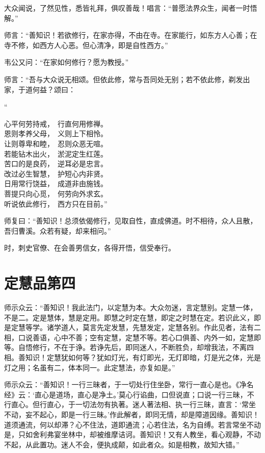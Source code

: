 \documentclass[UTF8, 11pt, oneside]{ctexart}
\newenvironment{jizi}[1]{
    \vspace{-1em}\begin{center}
        #1%
        \begin{varwidth}[t]{\linewidth}
}{
        \end{varwidth}
    \end{center}
}
\begin{document}
大众闻说，了然见性，悉皆礼拜，俱叹善哉！唱言：“普愿法界众生，闻者一时悟解。”

师言：“善知识！若欲修行，在家亦得，不由在寺。在家能行，如东方人心善；在寺不修，如西方人心恶。但心清净，即是自性西方。”

韦公又问：“在家如何修行？愿为教授。”

师言：“吾与大众说无相颂。但依此修，常与吾同处无别；若不依此修，剃发出家，于道何益？颂曰：

\begin{jizi}{“}
    心平何劳持戒，　行直何用修禅。 \\
    恩则孝养父母，　义则上下相怜。 \\
    让则尊卑和睦，　忍则众恶无喧。 \\
    若能钻木出火，　淤泥定生红莲。 \\
    苦口的是良药，　逆耳必是忠言。 \\
    改过必生智慧，　护短心内非贤。 \\
    日用常行饶益，　成道非由施钱。 \\
    菩提只向心觅，　何劳向外求玄。 \\
    听说依此修行，　西方只在目前。”
\end{jizi}

师复曰：“善知识！总须依偈修行，见取自性，直成佛道。时不相待，众人且散，吾归曹溪。众若有疑，却来相问。”

时，刺史官僚、在会善男信女，各得开悟，信受奉行。



\section*{定慧品第四}

师示众云：“善知识！我此法门，以定慧为本。大众勿迷，言定慧别。定慧一体，不是二。定是慧体，慧是定用。即慧之时定在慧，即定之时慧在定。若识此义，即是定慧等学。诸学道人，莫言先定发慧，先慧发定，定慧各别。作此见者，法有二相，口说善语，心中不善；空有定慧，定慧不等。若心口俱善、内外一如，定慧即等。自悟修行，不在于诤。若诤先后，即同迷人，不断胜负，却增我法，不离四相。善知识！定慧犹如何等？犹如灯光，有灯即光，无灯即暗，灯是光之体，光是灯之用；名虽有二，体本同一。此定慧法，亦复如是。”

师示众云：“善知识！一行三昧者，于一切处行住坐卧，常行一直心是也。《净名经》云：‘直心是道场，直心是净土。’莫心行谄曲，口但说直；口说一行三昧，不行直心。但行直心，于一切法勿有执著。迷人著法相、执一行三昧，直言：‘常坐不动，妄不起心，即是一行三昧。’作此解者，即同无情，却是障道因缘。善知识！道须通流，何以却滞？心不住法，道即通流；心若住法，名为自缚。若言常坐不动是，只如舍利弗宴坐林中，却被维摩诘诃。善知识！又有人教坐，看心观静，不动不起，从此置功。迷人不会，便执成颠，如此者众。如是相教，故知大错。”
\end{document}
